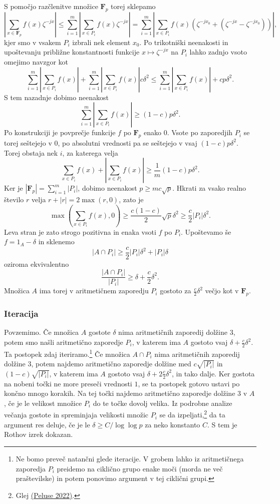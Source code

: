 \documentclass[11pt]{book}
\def\FF{\mathbf{F}}
\theoremstyle{definition}
\theoremstyle{zgled}
\theoremstyle{odprtproblem}
\theoremstyle{domacanaloga}
\theoremstyle{izrek}
\begin{document}
S pomočjo razčlenitve množice $\FF_p$ torej sklepamo
\[
   \left|\sum_{x \in \FF_p} f(x) \zeta^{-jx}\right| \leq
   \sum_{i = 1}^m \left| \sum_{x \in P_i} f(x) \zeta^{-jx} \right|
   = \sum_{i = 1}^m \left| \sum_{x \in P_i} f(x) \left( \zeta^{-jx_0} + (\zeta^{-jx} - \zeta^{-jx_0}) \right) \right|,
\]
kjer smo v vsakem $P_i$ izbrali nek element $x_0$. Po trikotniški neenakosti in upoštevanju približne konstantnosti funkcije $x \mapsto \zeta^{-jx}$ na $P_i$ lahko zadnjo vsoto omejimo navzgor kot
\[
    \sum_{i = 1}^m \left| \sum_{x \in P_i} f(x) \right| + 
    \sum_{i = 1}^m \left| \sum_{x \in P_i} f(x) \right| c \delta^2
    \leq \sum_{i = 1}^m \left| \sum_{x \in P_i} f(x) \right| + c p \delta^2.
\]
S tem nazadnje dobimo neenakost
\[
\sum_{i = 1}^m \left| \sum_{x \in P_i} f(x) \right| \geq (1-c) p \delta^2.
\]
Po konstrukciji je povprečje funkcije $f$ po $\FF_p$ enako $0$. Vsote po zaporedjih $P_i$ se torej seštejejo v $0$, po absolutni vrednosti pa se seštejejo v vsaj $(1-c) p \delta^2$. Torej obstaja nek $i$, za katerega velja
\[
    \sum_{x \in P_i} f(x)
    +
    \left| \sum_{x \in P_i} f(x) \right|
     \geq \frac{1}{m} (1-c) p \delta^2.  
\]
Ker je $|\FF_p| = \sum_{i = 1}^m |P_i|$, dobimo neenakost $p \geq m c \sqrt{p}$. Hkrati za vsako realno število $r$ velja $r + |r| = 2 \max(r, 0)$, zato je
\[
    \max \left( \sum_{x \in P_i} f(x), 0 \right) \geq
    \frac{c (1-c)}{2}  \sqrt{p} \delta^2
    \geq \frac{c}{2} |P_i| \delta^2.  
\]
Leva stran je zato strogo pozitivna in enaka vsoti $f$ po $P_i$. Upoštevamo še $f = 1_A - \delta$ in sklenemo
\[
    |A \cap P_i| \geq \frac{c}{2} |P_i| \delta^2 + |P_i| \delta
\]
oziroma ekvivalentno
\[
    \frac{|A \cap P_i|}{|P_i|} \geq \delta + \frac{c}{2} \delta^2.
\]
Množica $A$ ima torej v aritmetičnem zaporedju $P_i$ gostoto za $\frac{c}{2} \delta^2$ večjo kot v $\FF_p$.

\subsubsection{Iteracija}

Povzemimo. Če množica $A$ gostote $\delta$ nima aritmetičnih zaporedij dolžine $3$, potem smo našli aritmetično zaporedje $P_i$, v katerem ima $A$ gostoto vsaj $\delta + \frac{c}{2} \delta^2$. Ta postopek zdaj iteriramo.\footnote{Ne bomo preveč natančni glede iteracije. V grobem lahko iz aritmetičnega zaporedja $P_i$ preidemo na ciklično grupo enake moči (morda ne več praštevilske) in potem ponovimo argument v tej ciklični grupi.} Če množica $A \cap P_i$ nima aritmetičnih zaporedij dolžine $3$, potem najdemo aritmetično zaporedje dolžine med $c\sqrt{|P_i|}$ in $(1-c)\sqrt{|P_i|}$, v katerem ima $A$ gostoto vsaj $\delta + 2 \frac{c}{2} \delta^2$, in tako dalje. Ker gostota na nobeni točki ne more preseči vrednosti $1$, se ta postopek gotovo ustavi po končno mnogo korakih. Na tej točki najdemo aritmetično zaporedje dolžine $3$ v $A$, če je le velikost množice $P_i$ do te točke dovolj velika. Iz podrobne analize večanja gostote in spreminjaja velikosti množic $P_i$ se da izpeljati,\footnote{Glej \href{https://arxiv.org/pdf/2206.10037.pdf}{(Peluse 2022)}.} da ta argument res deluje, če je le $\delta \geq C/\log \log p$ za neko konstanto $C$. S tem je Rothov izrek dokazan.
\end{document}

